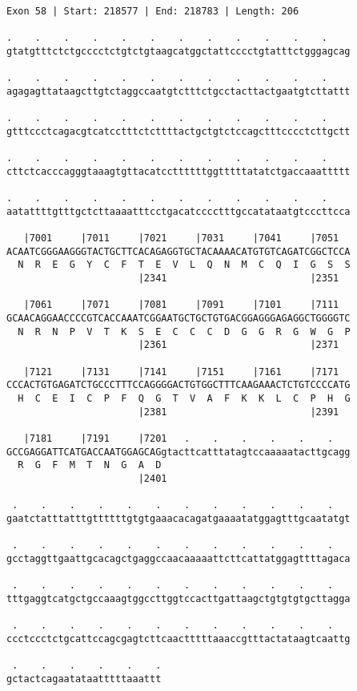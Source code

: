 \documentclass{article}
\begin{document}
\begin{Verbatim}
Exon 58 | Start: 218577 | End: 218783 | Length: 206
 
.    .    .    .    .    .    .    .    .    .    .    .    
gtatgtttctctgcccctctgtctgtaagcatggctattcccctgtatttctgggagcag
  
.    .    .    .    .    .    .    .    .    .    .    .    
agagagttataagcttgtctaggccaatgtctttctgcctacttactgaatgtcttattt
  
.    .    .    .    .    .    .    .    .    .    .    .    
gtttccctcagacgtcatcctttctcttttactgctgtctccagctttcccctcttgctt
  
.    .    .    .    .    .    .    .    .    .    .    .    
cttctcacccagggtaaagtgttacatccttttttggtttttatatctgaccaaattttt
  
.    .    .    .    .    .    .    .    .    .    .    .    
aatattttgtttgctcttaaaatttcctgacatcccctttgccatataatgtcccttcca
  
   |7001     |7011     |7021     |7031     |7041     |7051  
ACAATCGGGAAGGGTACTGCTTCACAGAGGTGCTACAAAACATGTGTCAGATCGGCTCCA
  N  R  E  G  Y  C  F  T  E  V  L  Q  N  M  C  Q  I  G  S  S
                       |2341                         |2351  
  
   |7061     |7071     |7081     |7091     |7101     |7111  
GCAACAGGAACCCCGTCACCAAATCGGAATGCTGCTGTGACGGAGGGAGAGGCTGGGGTC
  N  R  N  P  V  T  K  S  E  C  C  C  D  G  G  R  G  W  G  P
                       |2361                         |2371  
  
   |7121     |7131     |7141     |7151     |7161     |7171  
CCCACTGTGAGATCTGCCCTTTCCAGGGGACTGTGGCTTTCAAGAAACTCTGTCCCCATG
  H  C  E  I  C  P  F  Q  G  T  V  A  F  K  K  L  C  P  H  G
                       |2381                         |2391  
  
   |7181     |7191     |7201   .    .    .    .    .    .   
GCCGAGGATTCATGACCAATGGAGCAGgtacttcatttatagtccaaaaatacttgcagg
  R  G  F  M  T  N  G  A  D                                 
                       |2401                                
  
 .    .    .    .    .    .    .    .    .    .    .    .   
gaatctatttatttgttttttgtgtgaaacacagatgaaaatatggagtttgcaatatgt
  
 .    .    .    .    .    .    .    .    .    .    .    .   
gcctaggttgaattgcacagctgaggccaacaaaaattcttcattatggagttttagaca
  
 .    .    .    .    .    .    .    .    .    .    .    .   
tttgaggtcatgctgccaaagtggccttggtccacttgattaagctgtgtgtgcttagga
  
 .    .    .    .    .    .    .    .    .    .    .    .   
ccctccctctgcattccagcgagtcttcaactttttaaaccgtttactataagtcaattg
  
 .    .    .    .    .    .
gctactcagaatataatttttaaattt
\end{Verbatim}
\end{document}
